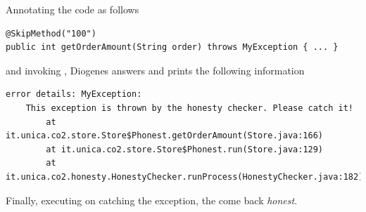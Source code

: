 Annotating the code as follows
\begin{mdframed}
\begin{verbatim}
@SkipMethod("100")
public int getOrderAmount(String order) throws MyException { ... }
\end{verbatim}
\end{mdframed}

and invoking ,
Diogenes answers  and prints the following information
\begin{mdframed}
\begin{verbatim}
error details: MyException: 
    This exception is thrown by the honesty checker. Please catch it!
        at it.unica.co2.store.Store$Phonest.getOrderAmount(Store.java:166)
        at it.unica.co2.store.Store$Phonest.run(Store.java:129)
        at it.unica.co2.honesty.HonestyChecker.runProcess(HonestyChecker.java:182)
\end{verbatim}
\end{mdframed}
Finally, executing  on catching the exception,
the come back \emph{honest}.






